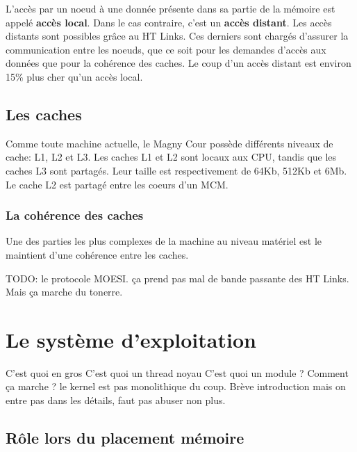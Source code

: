       L'accès par un noeud à une donnée présente dans sa partie de la mémoire
      est appelé \textbf{accès local}. Dans le cas contraire, c'est un
      \textbf{accès distant}. Les accès distants sont possibles grâce au HT
      Links. Ces derniers sont chargés d'assurer la communication entre les
      noeuds, que ce soit pour les demandes d'accès aux données que pour la
      cohérence des caches. Le coup d'un accès distant est environ 15\% plus
      cher qu'un accès local.\cite{Lepers2014}

    \subsection{Les caches}

      Comme toute machine actuelle, le Magny Cour possède différents niveaux de
      cache: L1, L2 et L3. Les caches L1 et L2 sont locaux aux CPU, tandis que
      les caches L3 sont partagés. Leur taille est respectivement de 64Kb, 512Kb
      et 6Mb. Le cache L2 est partagé entre les coeurs d'un MCM.

      \subsubsection{La cohérence des caches}

        Une des parties les plus complexes de la machine au niveau matériel est
        le maintient d'une cohérence entre les caches.

        TODO: le protocole MOESI. ça prend pas mal de bande passante des HT
        Links. Mais ça marche du tonerre.


  \section{Le système d'exploitation}

    C'est quoi en gros C'est quoi un thread noyau C'est quoi un module ?
    Comment ça marche ? le kernel est pas monolithique du coup.  Brève
    introduction mais on entre pas dans les détails, faut pas abuser non plus.

    \subsection{Rôle lors du placement mémoire}

